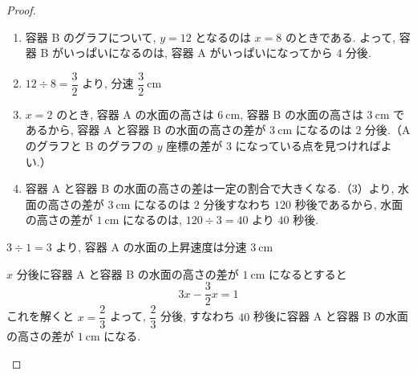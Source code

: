 \vspace{-1.5em}
\begin{proof}\mbox{}\\
    \vspace{-1.5em}
    \begin{hiddenanswer}
        \begin{enumerate}[itemsep=0.6em, topsep=0.3em, parsep=0pt, partopsep=0pt]
            \item 容器 B のグラフについて, $y = 12$ となるのは $x = 8$ のときである. よって, 容器 B がいっぱいになるのは, 容器 A がいっぱいになってから $4$ 分後.

            \item $12 \div 8 = \dfrac{3}{2}$ より, 分速 $\dfrac{3}{2}\ \mathrm{cm}$

            \item $x = 2$ のとき, 容器 A の水面の高さは $6\ \mathrm{cm}$, 容器 B の水面の高さは $3\ \mathrm{cm}$ であるから, 容器 A と容器 B の水面の高さの差が $3\ \mathrm{cm}$ になるのは $2$ 分後.（A のグラフと B のグラフの $y$ 座標の差が $3$ になっている点を見つければよい.）

            \item 容器 A と容器 B の水面の高さの差は一定の割合で大きくなる.（3）より, 水面の高さの差が $3\ \mathrm{cm}$ になるのは $2$ 分後すなわち $120$ 秒後であるから, 水面の高さの差が $1\ \mathrm{cm}$ になるのは, $120 \div 3 = 40$ より $40$ 秒後.
        \end{enumerate}
    \end{hiddenanswer}

    \vspace{-1em}
    \begin{altproof}
        $3 \div 1 = 3$ より, 容器 A の水面の上昇速度は分速 $3\ \mathrm{cm}$

        $x$ 分後に容器 A と容器 B の水面の高さの差が $1\ \mathrm{cm}$ になるとすると
        \[3x - \dfrac{3}{2}x = 1\]
        これを解くと $x = \dfrac{2}{3}$ よって, $\dfrac{2}{3}$ 分後, すなわち $40$ 秒後に容器 A と容器 B の水面の高さの差が $1\ \mathrm{cm}$ になる.
    \end{altproof}
\end{proof}

\newpage
